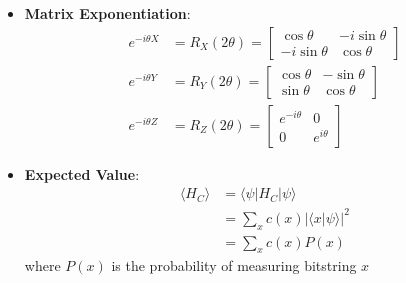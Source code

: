 \begin{multicols}{3}
\begin{itemize}[leftmargin=*,nosep,topsep=0pt]
                    \item \textbf{Matrix Exponentiation}:
                      \begin{align*}
                        e^{-i\theta X} &= R_X(2\theta) = \begin{bmatrix} \cos\theta & -i\sin\theta \\ -i\sin\theta & \cos\theta \end{bmatrix} \\
                        e^{-i\theta Y} &= R_Y(2\theta) = \begin{bmatrix} \cos\theta & -\sin\theta \\ \sin\theta & \cos\theta \end{bmatrix} \\
                        e^{-i\theta Z} &= R_Z(2\theta) = \begin{bmatrix} e^{-i\theta} & 0 \\ 0 & e^{i\theta} \end{bmatrix}
                      \end{align*}

                    \item \textbf{Expected Value}:
                      \begin{align*}
                        \langle H_C \rangle &= \langle\psi|H_C|\psi\rangle\\
                                            &= \sum_x c(x)|\langle x|\psi\rangle|^2\\
                                            &= \sum_x c(x)P(x)
                      \end{align*}
                      where $P(x)$ is the probability of measuring bitstring $x$
                  \end{itemize}


\end{multicols}
